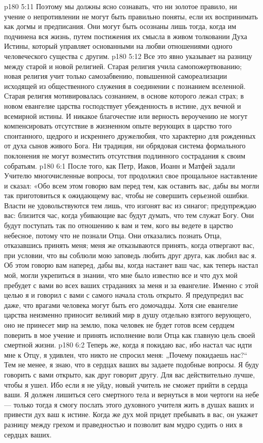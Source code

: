 \vs p180 5:11 Поэтому мы должны ясно сознавать, что ни золотое правило, ни учение о непротивлении не могут быть правильно поняты, если их воспринимать как догмы и предписания. Они могут быть осознаны лишь тогда, когда им подчинена вся жизнь, путем постижения их смысла в живом толковании Духа Истины, который управляет основанными на любви отношениями одного человеческого существа с другим.
\vs p180 5:12 Все это явно указывает на разницу между старой и новой религией. Старая религия учила самопожертвованию; новая религия учит только самозабвению, повышенной самореализации исходящей из общественного служения в соединении с познанием вселенной. Старая религия мотивировалась сознанием, в основе которого лежал страх; в новом евангелие царства господствует убежденность в истине, дух вечной и всемирной истины. И никакое благочестие или верность вероучению не могут компенсировать отсутствие в жизненном опыте верующих в царство того спонтанного, щедрого и искреннего дружелюбия, что характерно для рожденных от духа сынов живого Бога. Ни традиция, ни обрядовая система формального поклонения не могут возместить отсутствия подлинного сострадания к своим собратьям.
\vs p180 6:1 После того, как Петр, Иаков, Иоанн и Матфей задали Учителю многочисленные вопросы, тот продолжил свое прощальное наставление и сказал: «Обо всем этом говорю вам перед тем, как оставить вас, дабы вы могли так приготовиться к ожидающему вас, чтобы не совершить серьезной ошибки. Власти не удовольствуются тем лишь, что изгонят вас из синагог; предупреждаю вас: близится час, когда убивающие вас будут думать, что тем служат Богу. Они будут поступать так по отношению к вам и тем, кого вы ведете в царство небесное, потому что не познали Отца. Они отказались познать Отца, отказавшись принять меня; меня же отказываются принять, когда отвергают вас, при условии, что вы соблюли мою заповедь любить друг друга, как любил вас я. Об этом говорю вам наперед, дабы вы, когда настанет ваш час, как теперь настал мой, могли укрепиться в знании, что мне было известно все и что дух мой пребудет с вами во всех ваших страданиях за меня и за евангелие. Именно с этой целью я и говорил с вами с самого начала столь открыто. Я предупредил вас даже, что врагами человека могут быть его домочадцы. Хотя сие евангелие царства неизменно приносит великий мир в душу отдельно взятого верующего, оно не принесет мир на землю, пока человек не будет готов всем сердцем поверить в мое учение и принять исполнение воли Отца как главную цель своей смертной жизни.
\vs p180 6:2 Теперь же, когда я покидаю вас, ибо настал час идти мне к Отцу, я удивлен, что никто не спросил меня: „Почему покидаешь нас?“ Тем не менее, я знаю, что в сердцах ваших вы задаете подобные вопросы. Я буду говорить с вами открыто, как друг говорит другу. Для вас действительно лучше, чтобы я ушел. Ибо если я не уйду, новый учитель не сможет прийти в сердца ваши. Я должен лишиться сего смертного тела и вернуться в мои чертоги на небе --- только тогда я смогу послать этого духовного учителя жить в душах ваших и привести дух ваш к истине. Когда же дух мой придет пребывать в вас, он укажет разницу между грехом и праведностью и позволит вам мудро судить о них в сердцах ваших.
